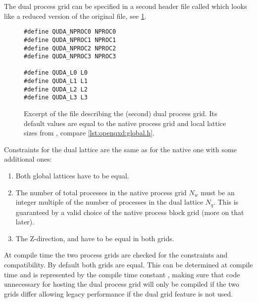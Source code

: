 The dual process grid can be specified in a second header file called  which looks like a reduced version of the original  file, see \cref{lst:interface:quda_global.h}.
\begin{figure}
\begin{codelisting}
\begin{verbatim}
#define QUDA_NPROC0 NPROC0
#define QUDA_NPROC1 NPROC1
#define QUDA_NPROC2 NPROC2
#define QUDA_NPROC3 NPROC3

#define QUDA_L0 L0
#define QUDA_L1 L1
#define QUDA_L2 L2
#define QUDA_L3 L3
\end{verbatim}
\caption{Excerpt of the file  describing the (second) dual process grid. Its default values are equal to the native process grid and local lattice sizes from , compare \cref{lst:openqxd:global.h}.}
\label{lst:interface:quda_global.h}
\end{codelisting}
\end{figure}

Constraints for the dual lattice are the same as for the native one with some additional ones:
\begin{enumerate}
  \item Both global lattices have to be equal.
  \item The number of total processes in the native process grid $N_w$ must be an integer multiple of the number of processes in the dual lattice $N_q$. This is guaranteed by a valid choice of the native process block grid (more on that later).
  \item The Z-direction,  and  have to be equal in both grids.
\end{enumerate}
At compile time the two process grids are checked for the constraints and compatibility. By default both grids are equal. This can be determined at compile time and is represented by the compile time constant , making sure that code unnecessary for hosting the dual process grid will only be compiled if the two grids differ allowing legacy performance if the dual grid feature is not used.

